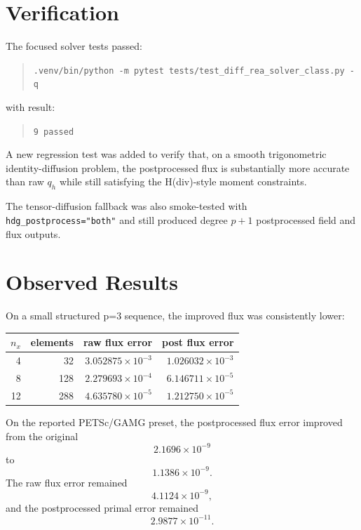 \documentclass[11pt]{article}
\begin{document}
\section{Verification}

The focused solver tests passed:
\begin{quote}
\verb|.venv/bin/python -m pytest tests/test_diff_rea_solver_class.py -q|
\end{quote}
with result:
\begin{quote}
\verb|9 passed|
\end{quote}

A new regression test was added to verify that, on a smooth trigonometric
identity-diffusion problem, the postprocessed flux is substantially more
accurate than raw $q_h$ while still satisfying the H(div)-style moment
constraints.

The tensor-diffusion fallback was also smoke-tested with
\verb|hdg_postprocess="both"| and still produced degree $p+1$ postprocessed
field and flux outputs.

\section{Observed Results}

On a small structured p=3 sequence, the improved flux was consistently lower:
\begin{center}
\begin{tabular}{rrrr}
\toprule
$n_x$ & elements & raw flux error & post flux error \\
\midrule
4  & 32  & $3.052875 \times 10^{-3}$ & $1.026032 \times 10^{-3}$ \\
8  & 128 & $2.279693 \times 10^{-4}$ & $6.146711 \times 10^{-5}$ \\
12 & 288 & $4.635780 \times 10^{-5}$ & $1.212750 \times 10^{-5}$ \\
\bottomrule
\end{tabular}
\end{center}

On the reported PETSc/GAMG preset, the postprocessed flux error improved from
the original
\[
2.1696 \times 10^{-9}
\]
to
\[
1.1386 \times 10^{-9}.
\]
The raw flux error remained
\[
4.1124 \times 10^{-9},
\]
and the postprocessed primal error remained
\[
2.9877 \times 10^{-11}.
\]
\end{document}

